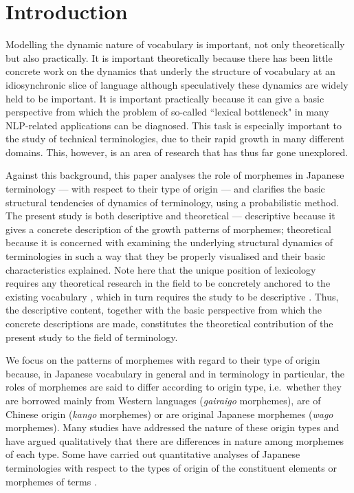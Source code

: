 



\maketitle

\section{Introduction}

\thispagestyle{empty}
Modelling the dynamic nature of vocabulary is important, not only 
theoretically but also practically. It is important theoretically because there 
has been little concrete work on the dynamics that underly the 
structure of vocabulary at an idiosynchronic slice of language although 
speculatively these dynamics are widely held to be important. It is important
practically because 
it can give a basic perspective from which the problem of so-called 
``lexical bottleneck" in many NLP-related applications can be diagnosed.
This task is especially important to the study of technical terminologies, due to 
their rapid growth in many different domains. This, however, is an area 
of research that has thus far gone unexplored.

Against this background, this paper analyses the role of morphemes 
in Japanese terminology --- with respect to their type of origin --- and 
clarifies the basic structural tendencies of dynamics of terminology, 
using a probabilistic method. The present study is both descriptive and 
theoretical --- descriptive because it gives a concrete 
description of the growth patterns of morphemes; theoretical because 
it is concerned with examining the underlying structural dynamics 
of terminologies in such a way that they be properly visualised and their 
basic characteristics explained. Note here that the unique position 
of lexicology requires any theoretical research in the field to be 
concretely anchored to the existing vocabulary \cite{maeda89}, which 
in turn requires the study to be descriptive \cite{kage02}. Thus, the
descriptive content, together with the basic perspective from which
the concrete descriptions are made, constitutes the theoretical 
contribution of the present study to the field of terminology.

We focus on the patterns of morphemes with regard to their type 
of origin because, in Japanese vocabulary in general and in terminology 
in particular, the roles of morphemes are said to differ according 
to origin type, i.e.\ whether they are borrowed mainly from Western 
languages ({\it gairaigo} morphemes), are of Chinese origin ({\it kango} 
morphemes) or are original Japanese morphemes ({\it wago} morphemes). Many 
studies have addressed the nature of these origin types 
\cite{saiga57,nlri58,miyaji82,nomura84} and have argued qualitatively 
that there are differences in nature among morphemes of each type.
Some have carried out quantitative analyses of Japanese 
terminologies with respect to the types of origin of the constituent 
elements or morphemes of terms \cite{ishii84,ishii87}.

